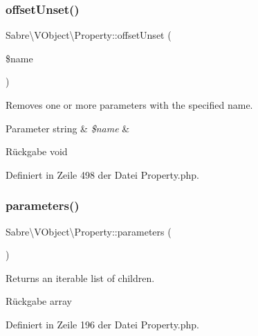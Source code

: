 \subsubsection{\texorpdfstring{offset\+Unset()}{offsetUnset()}}
{\footnotesize\ttfamily Sabre\textbackslash{}\+V\+Object\textbackslash{}\+Property\+::offset\+Unset (\begin{DoxyParamCaption}\item[{}]{\$name }\end{DoxyParamCaption})}

Removes one or more parameters with the specified name.


\begin{DoxyParams}[1]{Parameter}
string & {\em \$name} & \\
\hline
\end{DoxyParams}
\begin{DoxyReturn}{Rückgabe}
void 
\end{DoxyReturn}


Definiert in Zeile 498 der Datei Property.\+php.

\mbox{\label{class_sabre_1_1_v_object_1_1_property_a15eeef3d5c2776824cc9b40f1ee18322}} 
\subsubsection{\texorpdfstring{parameters()}{parameters()}}
{\footnotesize\ttfamily Sabre\textbackslash{}\+V\+Object\textbackslash{}\+Property\+::parameters (\begin{DoxyParamCaption}{ }\end{DoxyParamCaption})}

Returns an iterable list of children.

\begin{DoxyReturn}{Rückgabe}
array 
\end{DoxyReturn}


Definiert in Zeile 196 der Datei Property.\+php.

\mbox{\label{class_sabre_1_1_v_object_1_1_property_a1906505765574000b55838c0e5ca5130}} 
